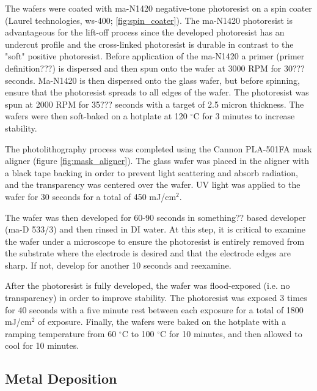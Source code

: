 \par The wafers were coated with ma-N1420 negative-tone photoresist on a spin coater (Laurel technologies, ws-400; \ref{fig:spin_coater}). The ma-N1420 photoresist is advantageous for the lift-off process since the developed photoresist has an undercut profile and the cross-linked photoresist is durable in contrast to the "soft" positive photoresist. Before application of the ma-N1420 a primer (primer definition???) is dispersed and then spun onto the wafer at 3000 RPM for 30??? seconds. Ma-N1420 is then dispersed onto the glass wafer, but before spinning, ensure that the photoresist spreads to all edges of the wafer. The photoresist was spun at 2000 RPM for 35??? seconds with a target of 2.5 micron thickness. The wafers were then soft-baked on a hotplate at 120 $^\circ$C for 3 minutes to increase stability. 

\par The photolithography process was completed using the Cannon PLA-501FA mask aligner (figure \ref{fig:mask_aligner}). The glass wafer was placed in the aligner with a black tape backing in order to prevent light scattering and absorb radiation, and the transparency was centered over the wafer. UV light was applied to the wafer for 30 seconds for a total of 450 mJ/cm$^2$. 

\par The wafer was then developed for 60-90 seconds in something?? based developer (ma-D 533/3) and then rinsed in DI water. At this step, it is critical to examine the wafer under a microscope to ensure the photoresist is entirely removed from the substrate where the electrode is desired and that the electrode edges are sharp. If not, develop for another 10 seconds and reexamine. 

\par After the photoresist is fully developed, the wafer was flood-exposed (i.e. no transparency) in order to improve stability. The photoresist was exposed 3 times for 40 seconds with a five minute rest between each exposure for a total of 1800 mJ/cm$^2$ of exposure. Finally, the wafers were baked on the hotplate with a ramping temperature from 60 $^\circ$C to 100 $^\circ$C for 10 minutes, and then allowed to cool for 10 minutes. 

\subsection*{Metal Deposition}

